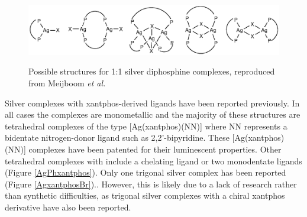 \begin{figure}[h] 
\begin{center}
\vspace{0.5cm}
\includegraphics[scale=0.8]{../Figures/Possiblesilverstructures.eps}
\caption[1:1 silver diphosphine complexes]{Possible structures for 1:1 silver diphosphine complexes, reproduced from Meijboom \emph{et al.}\cite{Meijboom2009}}
\vspace{0.2cm}
\label{Silverstructures}
\end{center}
\end{figure}
\vspace{0.2cm}


Silver complexes with xantphos-derived ligands have been reported previously.\cite{Malaise2006, Balakrishna2008}  In all cases the complexes are monometallic and the majority of these structures are tetrahedral complexes of the type [Ag(xantphos)(NN)] where NN represents a bidentate nitrogen-donor ligand such as 2,2'-bipyridine.  These [Ag(xantphos)(NN)] complexes have been patented for their luminescent properties.\cite{Kobayashi2010, Kobayashi2011a, Kobayashi2012a} Other tetrahedral complexes with \Phxantphos{} include a chelating ligand or two monodentate ligands (Figure \ref{AgPhxantphos}).  Only one trigonal silver \Phxantphos complex has been reported (Figure \ref{AgxantphosBr}).\cite{Kaltzoglou2007}.  However, this is likely due to a lack of research rather than synthetic difficulties, as trigonal silver complexes with a chiral xantphos derivative have also been reported.\cite{Malaise2006}

